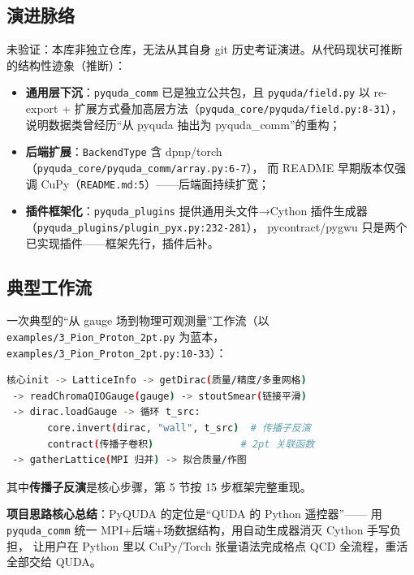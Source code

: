 \documentclass[UTF8]{ctexart}
\begin{document}
\subsection{演进脉络}
\textcolor{warn}{未验证}：本库非独立仓库，无法从其自身 git 历史考证演进。从代码现状可推断
的结构性迹象（\textcolor{relation}{推断}）：
\begin{itemize}
  \item \textbf{通用层下沉}：\texttt{pyquda\_comm} 已是独立公共包，且 \texttt{pyquda/field.py}
        以 re-export + 扩展方式叠加高层方法（\texttt{\nolinkurl{pyquda_core/pyquda/field.py:8-31}}），
        说明数据类曾经历“从 pyquda 抽出为 pyquda\_comm”的重构；
  \item \textbf{后端扩展}：\texttt{BackendType} 含 dpnp/torch（\texttt{\nolinkurl{pyquda_core/pyquda_comm/array.py:6-7}}），
        而 README 早期版本仅强调 CuPy（\texttt{\nolinkurl{README.md:5}}）——后端面持续扩宽；
  \item \textbf{插件框架化}：\texttt{pyquda\_plugins} 提供通用头文件→Cython 插件生成器
        （\texttt{\nolinkurl{pyquda_plugins/plugin_pyx.py:232-281}}），
        pycontract/pygwu 只是两个已实现插件——框架先行，插件后补。
\end{itemize}

\subsection{典型工作流}
一次典型的“从 gauge 场到物理可观测量”工作流（以 \texttt{examples/3\_Pion\_Proton\_2pt.py}
为蓝本，\texttt{\nolinkurl{examples/3_Pion_Proton_2pt.py:10-33}}）：
\begin{lstlisting}[language=bash]
 核心init -> LatticeInfo -> getDirac(质量/精度/多重网格)
 -> readChromaQIOGauge(gauge) -> stoutSmear(链接平滑)
 -> dirac.loadGauge -> 循环 t_src:
       core.invert(dirac, "wall", t_src)  # 传播子反演
       contract(传播子卷积)               # 2pt 关联函数
 -> gatherLattice(MPI 归并) -> 拟合质量/作图
\end{lstlisting}
其中\textbf{传播子反演}是核心步骤，第 5 节按 15 步框架完整重现。

\begin{ideabox}
\textbf{项目思路核心总结}：PyQUDA 的定位是“\textcolor{idea}{QUDA 的 Python 遥控器}”——
用 \texttt{pyquda\_comm} 统一 MPI+后端+场数据结构，用自动生成器消灭 Cython 手写负担，
让用户在 Python 里以 CuPy/Torch 张量语法完成格点 QCD 全流程，重活全部交给 QUDA。
\end{ideabox}

\end{document}
